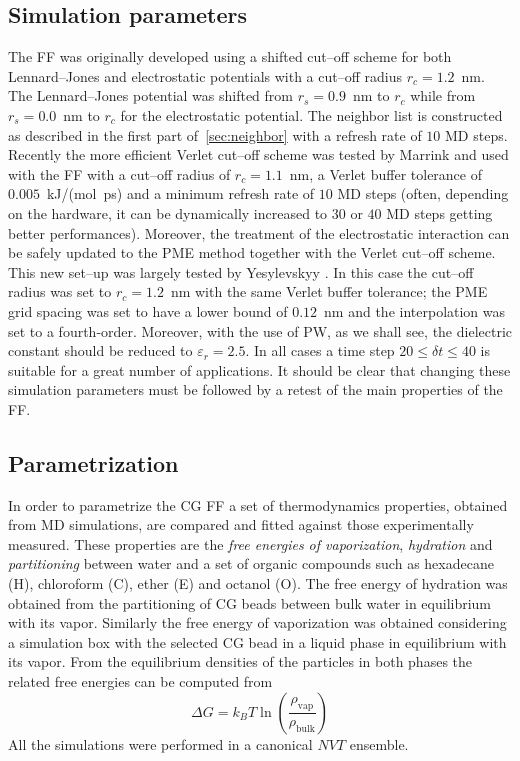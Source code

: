 \subsection{Simulation parameters}
The \martini{} \ac{FF} was originally developed using a shifted cut--off scheme for both Lennard--Jones and
electrostatic potentials with a cut--off radius $r_c = 1.2$~nm. The Lennard--Jones potential was shifted from
$r_s = 0.9$~nm to $r_c$ while from $r_s = 0.0$~nm to $r_c$ for the electrostatic potential. The neighbor list is
constructed as described in the first part of~\ref{sec:neighbor} with a refresh rate of $10$ \ac{MD} steps.
Recently the more efficient Verlet cut--off scheme was tested by Marrink \etal{} \cite{MartiniReview} and used
with the \martini{} \ac{FF} with a cut--off radius of $r_c = 1.1$~nm, a Verlet buffer tolerance of $0.005$~kJ/(mol\
ps) and a minimum refresh rate of $10$ \ac{MD} steps (often, depending on the hardware, it can be dynamically
increased to $30$ or $40$ \ac{MD} steps getting better performances).  Moreover, the treatment of the
electrostatic interaction can be safely updated to the \ac{PME} method together with the Verlet cut--off scheme.
This new set--up was largely tested by Yesylevskyy \etal{} \cite{PW}. In this case the cut--off radius was set to
$r_c = 1.2$~nm with the same Verlet buffer tolerance; the \ac{PME} grid spacing was set to have a lower bound of
$0.12$~nm and the interpolation was set to a fourth-order. Moreover, with the use of \ac{PW}, as we shall see,
the dielectric constant should be reduced to $\varepsilon_r = 2.5$. In all cases a time step
$20\le\delta t\le 40$ is suitable for a great number of applications. It should be clear that changing these
simulation parameters must be followed by a retest of the main properties of the \martini{} \ac{FF}.

\subsection{Parametrization}
\label{sec:martiniParam}
In order to parametrize the \martini{} \ac{CG} \ac{FF} a set of thermodynamics properties, obtained from \ac{MD}
simulations, are compared and fitted against those experimentally measured. These properties are the \textit{free
energies of vaporization}, \textit{hydration} and \textit{partitioning} between water and a set of organic
compounds such as hexadecane (H), chloroform (C), ether (E) and octanol (O). The free energy of hydration was
obtained from the partitioning of \ac{CG} beads between bulk water in equilibrium with its vapor. Similarly the
free energy of vaporization was obtained considering a simulation box with the selected \ac{CG} bead in a liquid
phase in equilibrium with its vapor. From the equilibrium densities of the particles in both phases the related
free energies can be computed from
\begin{equation*}
	\Delta G = k_B T\ln \left ( \frac{\rho_{\text{vap}}}{\rho_{\text{bulk}}} \right )
\end{equation*}
All the simulations were performed in a canonical $NVT$ ensemble.

